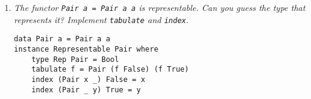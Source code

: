 \documentclass[11pt]{article}
\begin{document}
\begin{enumerate}
\begin{verbatim}
index (tabulate f) (n+1)
= { definition of tabulate }
  index (Const (f 0) (tabulate (f . (+1)))) (n+1)
= { definition of index }
  if n+1 == 0 then f 0 else index (Const (f 0) (tabulate (f . (+1)))) n
= { n+1 > 0 }
  index (Const (f 0) (tabulate (f . (+1)))) n
= { induction hypothesis }
  (f . (+1)) n
= { definition of (.) }
  f (n+1)
\end{verbatim}

Luego \texttt{index . tabulate = id}. Por otro lado:

\begin{verbatim}
tabulate (index (Cons b bs))
= { definition of tabulate }
  Cons (index (Cons b bs) 0) (tabulate (index (Cons b bs) . (+1)))
= { definition of index }
  Cons b (tabulate (index (Cons b bs) . (+1)))
= { η introduction }
  Cons b (tabulate (\n -> index (Cons b bs) (n+1)))
= { definition of index with n+1 > 0 }
  Cons b (tabulate (\n -> index bs n))
= { η elimination }
  Cons b (tabulate (index bs))
\end{verbatim}

Por inducción, se deduce que \texttt{tabulate . index = id}.

\item \textit{The functor \texttt{Pair a = Pair a a} is representable. Can you guess the type that represents it? Implement \texttt{tabulate} and \texttt{index}}.

\begin{verbatim}
data Pair a = Pair a a
instance Representable Pair where
    type Rep Pair = Bool
    tabulate f = Pair (f False) (f True)
    index (Pair x _) False = x
    index (Pair _ y) True = y
\end{verbatim}
\end{enumerate}
\end{document}

